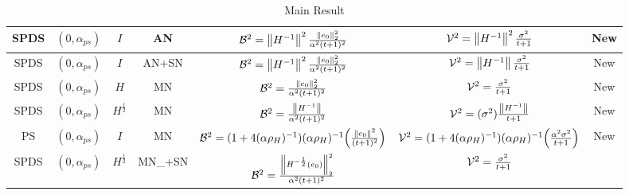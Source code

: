 \begin{table*}[t]
\begin{center}
{\begin{tabular}{|c|c|c|c|c|c|c|}
SPDS    & $(0,\alpha_{ps})$     &   $I$     & AN        &   $\mathcal{B}^2=\left\| H^{-1}\right\|^2\frac{\left\| e_0\right\|^2_2}{\alpha^2(t+1)^2}$& $\mathcal{V}^2=\left\| H^{-1}\right\|^2\frac{\sigma^2}{t+1}$& New \\   \hline
SPDS    & $(0,\alpha_{ps})$     &   $I$     & AN+SN        &   $\mathcal{B}^2=\left\| H^{-1}\right\|^2\frac{\left\| e_0\right\|^2_2}{\alpha^2(t+1)^2}$& $\mathcal{V}^2=\left\| H^{-1}\right\|\frac{\sigma^2}{t+1}$& New \\   \hline
SPDS    & $(0,\alpha_{ps})$     &   $H$     & MN        &  $\mathcal{B}^2=\frac{\left\| e_0\right\|^2_2}{\alpha^2(t+1)^2}$& $\mathcal{V}^2=\frac{\sigma^2}{t+1}$& New \\   \hline
SPDS    & $(0,\alpha_{ps})$     &   $H^{\frac{1}{2}}$     & MN        &   $\mathcal{B}^2=\frac{\left\| H^{-1}\right\|}{\alpha^2(t+1)^2}$& $\mathcal{V}^2=(\sigma^2)\frac{\left\| H^{-1}\right\|}{t+1}$& New \\   \hline
PS       & $(0,\alpha_{ps})$    &   $I$     & MN        &   $\mathcal{B}^2=(1+4(\alpha\rho_H)^{-1}) (\alpha\rho_H)^{-1} \Big(\frac{\left\| e_0\right\|^2}{(t+1)^2}\Big)$& $\mathcal{V}^2=(1+4(\alpha\rho_H)^{-1}) (\alpha\rho_H)^{-1} \Big(\frac{\alpha^2\sigma^2}{t+1} \Big)$& New \\   \hline
SPDS    & $(0,\alpha_{ps})$     &   $H^{\frac{1}{2}}$     & MN_+SN        &   $\mathcal{B}^2=\frac{\left\| H^{-\frac{1}{2}}(e_0)\right\|^2_2}{\alpha^2(t+1)^2}$& $\mathcal{V}^2=\frac{\sigma^2}{t+1}$& \cite{} \\   \hline
\end{tabular}
}
\end{center}
\caption{Main Result}
\label{maintable}
\end{table*}
